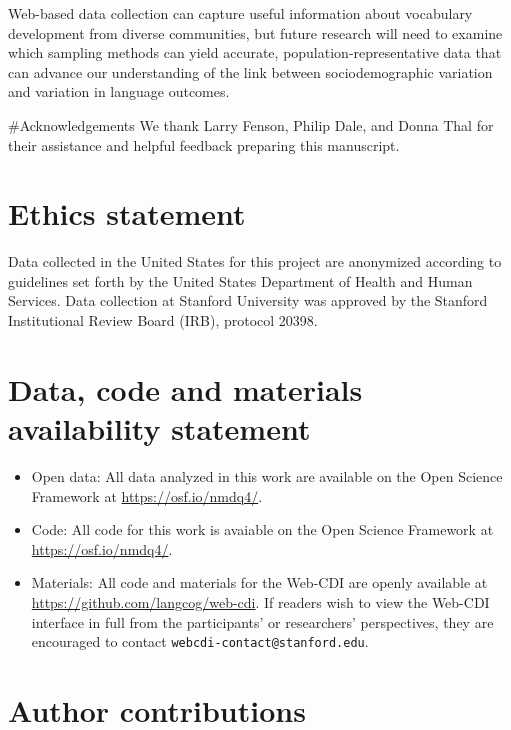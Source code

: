 \documentclass[
  english,
  ,man,floatsintext]{apa6}
\providecommand{\tightlist}{%
  \setlength{\itemsep}{0pt}\setlength{\parskip}{0pt}}
\begin{document}
Web-based data collection can capture useful information about vocabulary development from diverse communities, but future research will need to examine which sampling methods can yield accurate, population-representative data that can advance our understanding of the link between sociodemographic variation and variation in language outcomes.

\#Acknowledgements
We thank Larry Fenson, Philip Dale, and Donna Thal for their assistance and helpful feedback preparing this manuscript.

\hypertarget{ethics-statement}{%
\section{Ethics statement}\label{ethics-statement}}

Data collected in the United States for this project are anonymized according to guidelines set forth by the United States Department of Health and Human Services. Data collection at Stanford University was approved by the Stanford Institutional Review Board (IRB), protocol 20398.

\hypertarget{data-code-and-materials-availability-statement}{%
\section{Data, code and materials availability statement}\label{data-code-and-materials-availability-statement}}

\begin{itemize}
\tightlist
\item
  Open data: All data analyzed in this work are available on the Open Science Framework at \url{https://osf.io/nmdq4/}.
\item
  Code: All code for this work is avaiable on the Open Science Framework at \url{https://osf.io/nmdq4/}.
\item
  Materials: All code and materials for the Web-CDI are openly available at \url{https://github.com/langcog/web-cdi}. If readers wish to view the Web-CDI interface in full from the participants' or researchers' perspectives, they are encouraged to contact \texttt{webcdi-contact@stanford.edu}.
\end{itemize}

\hypertarget{author-contributions}{%
\section{Author contributions}\label{author-contributions}}
\end{document}
